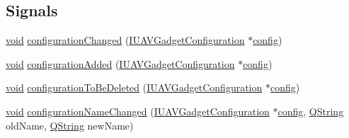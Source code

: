 \subsection*{Signals}
\begin{DoxyCompactItemize}
\item 
\hyperlink{group___u_a_v_objects_plugin_ga444cf2ff3f0ecbe028adce838d373f5c}{void} \hyperlink{group___core_plugin_ga99c492de558d9dccc16073ff82d79419}{configuration\-Changed} (\hyperlink{class_core_1_1_i_u_a_v_gadget_configuration}{I\-U\-A\-V\-Gadget\-Configuration} $\ast$\hyperlink{deflate_8c_a4473b5227787415097004fd39f55185e}{config})
\item 
\hyperlink{group___u_a_v_objects_plugin_ga444cf2ff3f0ecbe028adce838d373f5c}{void} \hyperlink{group___core_plugin_gaca35112f1648a58ef28001ee643931bc}{configuration\-Added} (\hyperlink{class_core_1_1_i_u_a_v_gadget_configuration}{I\-U\-A\-V\-Gadget\-Configuration} $\ast$\hyperlink{deflate_8c_a4473b5227787415097004fd39f55185e}{config})
\item 
\hyperlink{group___u_a_v_objects_plugin_ga444cf2ff3f0ecbe028adce838d373f5c}{void} \hyperlink{group___core_plugin_gaff37c6a99697161f556ab317acd527a5}{configuration\-To\-Be\-Deleted} (\hyperlink{class_core_1_1_i_u_a_v_gadget_configuration}{I\-U\-A\-V\-Gadget\-Configuration} $\ast$\hyperlink{deflate_8c_a4473b5227787415097004fd39f55185e}{config})
\item 
\hyperlink{group___u_a_v_objects_plugin_ga444cf2ff3f0ecbe028adce838d373f5c}{void} \hyperlink{group___core_plugin_ga00b3bb265a26c73dee0bd4842db52315}{configuration\-Name\-Changed} (\hyperlink{class_core_1_1_i_u_a_v_gadget_configuration}{I\-U\-A\-V\-Gadget\-Configuration} $\ast$\hyperlink{deflate_8c_a4473b5227787415097004fd39f55185e}{config}, \hyperlink{group___u_a_v_objects_plugin_gab9d252f49c333c94a72f97ce3105a32d}{Q\-String} old\-Name, \hyperlink{group___u_a_v_objects_plugin_gab9d252f49c333c94a72f97ce3105a32d}{Q\-String} new\-Name)
\end{DoxyCompactItemize}
